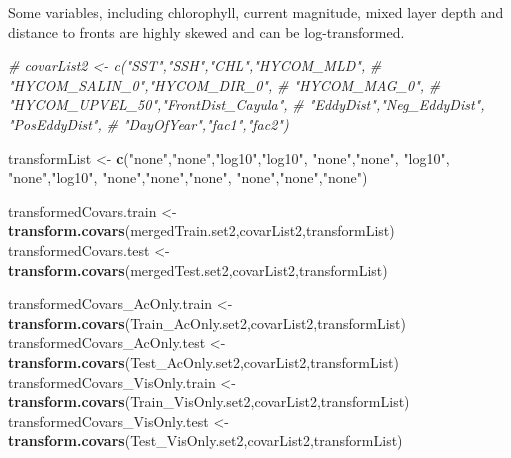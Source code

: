 \documentclass[11pt,]{article}
\newenvironment{Shaded}{\begin{snugshade}}{\end{snugshade}}
\newcommand{\KeywordTok}[1]{\textcolor[rgb]{0.13,0.29,0.53}{\textbf{{#1}}}}
\newcommand{\StringTok}[1]{\textcolor[rgb]{0.31,0.60,0.02}{{#1}}}
\newcommand{\CommentTok}[1]{\textcolor[rgb]{0.56,0.35,0.01}{\textit{{#1}}}}
\newcommand{\NormalTok}[1]{{#1}}
\begin{document}
Some variables, including chlorophyll, current magnitude, mixed layer
depth and distance to fronts are highly skewed and can be
log-transformed.

\begin{Shaded}
\begin{Highlighting}[]
\CommentTok{# covarList2 <- c("SST","SSH","CHL","HYCOM_MLD",}
\CommentTok{#                 "HYCOM_SALIN_0","HYCOM_DIR_0",}
\CommentTok{#                 "HYCOM_MAG_0",}
\CommentTok{#                 "HYCOM_UPVEL_50","FrontDist_Cayula",}
\CommentTok{#                 "EddyDist","Neg_EddyDist", "PosEddyDist",}
\CommentTok{#                 "DayOfYear","fac1","fac2")}

\NormalTok{transformList <-}\StringTok{ }\KeywordTok{c}\NormalTok{(}\StringTok{"none"}\NormalTok{,}\StringTok{"none"}\NormalTok{,}\StringTok{"log10"}\NormalTok{,}\StringTok{"log10"}\NormalTok{,}
                   \StringTok{"none"}\NormalTok{,}\StringTok{"none"}\NormalTok{,}
                   \StringTok{"log10"}\NormalTok{,}
                   \StringTok{"none"}\NormalTok{,}\StringTok{"log10"}\NormalTok{,}
                   \StringTok{"none"}\NormalTok{,}\StringTok{"none"}\NormalTok{,}\StringTok{"none"}\NormalTok{,}
                   \StringTok{"none"}\NormalTok{,}\StringTok{"none"}\NormalTok{,}\StringTok{"none"}\NormalTok{)}

\NormalTok{transformedCovars.train <-}
\StringTok{  }\KeywordTok{transform.covars}\NormalTok{(mergedTrain.set2,covarList2,transformList)}
\NormalTok{transformedCovars.test <-}\StringTok{ }
\StringTok{  }\KeywordTok{transform.covars}\NormalTok{(mergedTest.set2,covarList2,transformList)}

\NormalTok{transformedCovars_AcOnly.train <-}
\StringTok{  }\KeywordTok{transform.covars}\NormalTok{(Train_AcOnly.set2,covarList2,transformList)}
\NormalTok{transformedCovars_AcOnly.test <-}
\StringTok{  }\KeywordTok{transform.covars}\NormalTok{(Test_AcOnly.set2,covarList2,transformList)}
\NormalTok{transformedCovars_VisOnly.train <-}
\StringTok{  }\KeywordTok{transform.covars}\NormalTok{(Train_VisOnly.set2,covarList2,transformList)}
\NormalTok{transformedCovars_VisOnly.test <-}
\StringTok{  }\KeywordTok{transform.covars}\NormalTok{(Test_VisOnly.set2,covarList2,transformList)}


\end{Highlighting}
\end{Shaded}
\end{document}
